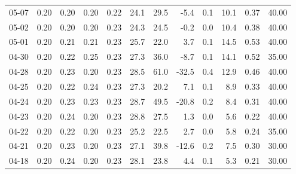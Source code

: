 \begin{threeparttable}
{\begin{tabular}{lrrrrrrrrrrr}
  05-07 &          0.20 &          0.20 &          0.20 &        0.22 &                24.1 &                29.5 &       -5.4 &                 0.1 &             10.1 &            0.37 &                  40.00 \\
  05-02 &          0.20 &          0.20 &          0.20 &        0.23 &                24.3 &                24.5 &       -0.2 &                 0.0 &             10.4 &            0.38 &                  40.00 \\
  05-01 &          0.20 &          0.21 &          0.21 &        0.23 &                25.7 &                22.0 &        3.7 &                 0.1 &             14.5 &            0.53 &                  40.00 \\
  04-30 &          0.20 &          0.22 &          0.25 &        0.23 &                27.3 &                36.0 &       -8.7 &                 0.1 &             14.1 &            0.52 &                  35.00 \\
  04-28 &          0.20 &          0.23 &          0.20 &        0.23 &                28.5 &                61.0 &      -32.5 &                 0.4 &             12.9 &            0.46 &                  40.00 \\
  04-25 &          0.20 &          0.22 &          0.24 &        0.23 &                27.3 &                20.2 &        7.1 &                 0.1 &              8.9 &            0.33 &                  40.00 \\
  04-24 &          0.20 &          0.23 &          0.23 &        0.23 &                28.7 &                49.5 &      -20.8 &                 0.2 &              8.4 &            0.31 &                  40.00 \\
  04-23 &          0.20 &          0.24 &          0.20 &        0.23 &                28.8 &                27.5 &        1.3 &                 0.0 &              5.6 &            0.22 &                  40.00 \\
  04-22 &          0.20 &          0.22 &          0.20 &        0.23 &                25.2 &                22.5 &        2.7 &                 0.0 &              5.8 &            0.24 &                  35.00 \\
  04-21 &          0.20 &          0.23 &          0.20 &        0.23 &                27.1 &                39.8 &      -12.6 &                 0.2 &              7.5 &            0.30 &                  30.00 \\
  04-18 &          0.20 &          0.24 &          0.20 &        0.23 &                28.1 &                23.8 &        4.4 &                 0.1 &              5.3 &            0.21 &                  30.00 \\

\end{tabular}}
\end{threeparttable}
